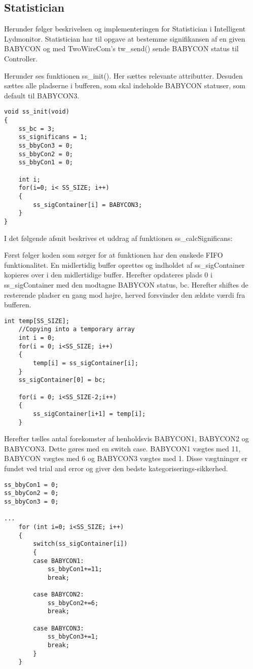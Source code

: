 \subsection{Statistician}
Herunder følger beskrivelsen og implementeringen for Statistician i Intelligent Lydmonitor.
Statistician har til opgave at bestemme signifikansen af en given BABYCON og med TwoWireCom's tw\_send() sende BABYCON status til Controller. 

Herunder ses funktionen ss\_init(). Her sættes relevante attributter. Desuden sættes alle pladserne i bufferen, som skal indeholde BABYCON statuser, som default til BABYCON3.
\begin{verbatim}
void ss_init(void)
{
    ss_bc = 3;
    ss_significans = 1;
    ss_bbyCon3 = 0;
    ss_bbyCon2 = 0;
    ss_bbyCon1 = 0;

    int i;
    for(i=0; i< SS_SIZE; i++)
    {
        ss_sigContainer[i] = BABYCON3;
    }
}
\end{verbatim}

I det følgende afsnit beskrives et uddrag af funktionen ss\_calcSignificans: 

Først følger koden som sørger for at funktionen har den ønskede FIFO funktionalitet. En midlertidig buffer oprettes og indholdet af ss\_sigContainer kopieres over i den midlertidige buffer. Herefter opdateres plads 0 i ss\_sigContainer med den modtagne BABYCON status, bc. Herefter shiftes de resterende pladser en gang mod højre, herved forsvinder den ældste værdi fra bufferen. 

\begin{verbatim}int temp[SS_SIZE];
    //Copying into a temporary array
    int i = 0;
    for(i = 0; i<SS_SIZE; i++)
    {
        temp[i] = ss_sigContainer[i];
    }
    ss_sigContainer[0] = bc;

    for(i = 0; i<SS_SIZE-2;i++)
    {
        ss_sigContainer[i+1] = temp[i];
    }
\end{verbatim}

Herefter tælles antal forekomster af henholdsvis BABYCON1, BABYCON2 og BABYCON3. Dette gøres med en switch case. BABYCON1 vægtes med 11, BABYCON vægtes med 6 og BABYCON3 vægtes med 1. Disse vægtninger er fundet ved trial and error og giver den bedste kategoriserings-sikkerhed. 

\begin{verbatim}
ss_bbyCon1 = 0;
ss_bbyCon2 = 0;
ss_bbyCon3 = 0;

...
    for (int i=0; i<SS_SIZE; i++)
    {
        switch(ss_sigContainer[i])
        {
        case BABYCON1:
            ss_bbyCon1+=11;
            break;

        case BABYCON2:
            ss_bbyCon2+=6;
            break;

        case BABYCON3:
            ss_bbyCon3+=1;
            break;
        }
    }
\end{verbatim}


